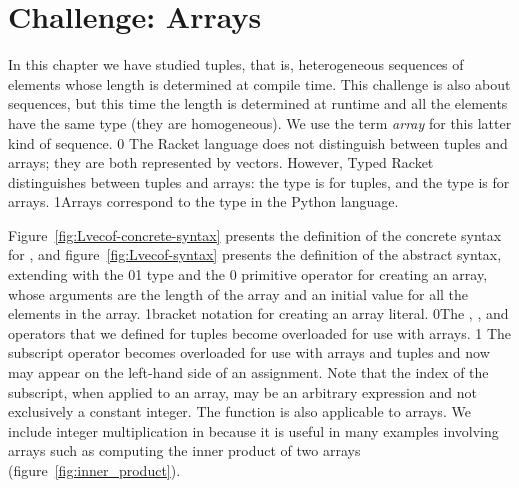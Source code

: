 \documentclass[7x10]{TimesAPriori_MIT}%
\def\racketEd{0}
\def\pythonEd{1}
\def\edition{1}
\newcommand{\racket}[1]{{\if\edition\racketEd{#1}\fi}}
\newcommand{\pythonColor}[0]{}
\newcommand{\python}[1]{{\if\edition\pythonEd\pythonColor #1\fi}}
\numberwithin{theorem}{chapter}
\numberwithin{definition}{chapter}
\numberwithin{equation}{chapter}
\begin{document}
\section{Challenge: Arrays}
\label{sec:arrays}


In this chapter we have studied tuples, that is, heterogeneous
sequences of elements whose length is determined at compile time. This
challenge is also about sequences, but this time the length is
determined at runtime and all the elements have the same type (they
are homogeneous). We use the term \emph{array} for this latter kind of
sequence.
%
\racket{
The Racket language does not distinguish between tuples and arrays;
they are both represented by vectors. However, Typed Racket
distinguishes between tuples and arrays: the \code{Vector} type is for
tuples, and the \code{Vectorof} type is for arrays.}%
\python{Arrays correspond to the  type in the Python language.}

Figure~\ref{fig:Lvecof-concrete-syntax} presents the definition of the
concrete syntax for \LangArray{}, and figure~\ref{fig:Lvecof-syntax}
presents the definition of the abstract syntax, extending \LangVec{}
with the \racket{}\python{} type and the
\racket{ primitive operator for creating an array,
whose arguments are the length of the array and an initial value for
all the elements in the array.}%
\python{bracket notation for creating an array literal.}
\racket{The ,
, and \code{vector-ref!} operators that we defined
for tuples become overloaded for use with arrays.}
\python{
The subscript operator becomes overloaded for use with arrays and tuples
and now may appear on the left-hand side of an assignment.
Note that the index of the subscript, when applied to an array, may be an
arbitrary expression and not exclusively a constant integer.
The \code{len} function is also applicable to arrays.
}
%
We include integer multiplication in \LangArray{} because it is
useful in many examples involving arrays such as computing the
inner product of two arrays (figure~\ref{fig:inner_product}).

\newcommand{\LarrayGrammarRacket}{
\begin{array}{lcl}
  \Type &::=& \LP \key{Vectorof}~\Type \RP \\
  \Exp &::=& \CMUL{\Exp}{\Exp}
       \MID \CMAKEVEC{\Exp}{\Exp} 
\end{array}
}
\newcommand{\LarrayASTRacket}{
\begin{array}{lcl}
  \Type &::=& \LP \key{Vectorof}~\Type \RP \\
  \Exp &::=& \MUL{\Exp}{\Exp}
       \MID \MAKEVEC{\Exp}{\Exp} 
\end{array}
}
\end{document}
